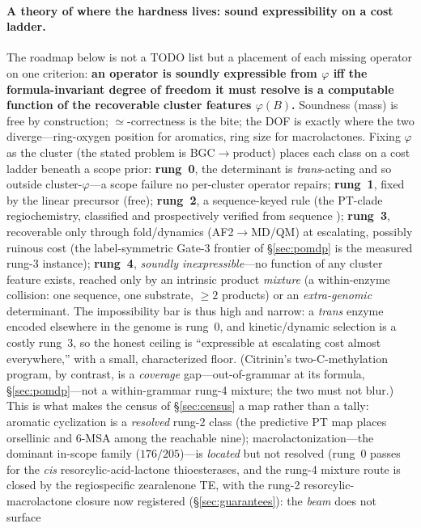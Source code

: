 \documentclass[11pt]{article}
\theoremstyle{definition}
\begin{document}
\paragraph{A theory of where the hardness lives: sound expressibility on a cost ladder.} The roadmap
below is not a TODO list but a placement of each missing operator on one criterion: \textbf{an operator
is soundly expressible from $\varphi$ iff the formula-invariant degree of freedom it must resolve is a
computable function of the recoverable cluster features $\varphi(B)$.} Soundness (mass) is free by
construction; $\simeq$-correctness is the bite; the DOF is exactly where the two diverge---ring-oxygen
position for aromatics, ring size for macrolactones. Fixing $\varphi$ as the cluster (the stated problem
is BGC$\to$product) places each class on a cost ladder beneath a scope prior: \textbf{rung~0}, the
determinant is \emph{trans}-acting and so outside cluster-$\varphi$---a scope failure no per-cluster
operator repairs; \textbf{rung~1}, fixed by the linear precursor (free); \textbf{rung~2}, a sequence-keyed
rule (the PT-clade regiochemistry, classified and prospectively verified from sequence
\citep{ptregio}); \textbf{rung~3}, recoverable only through fold/dynamics (AF2$\to$MD/QM) at escalating,
possibly ruinous cost (the label-symmetric Gate-3 frontier of \S\ref{sec:pomdp} is the measured rung-3
instance); \textbf{rung~4}, \emph{soundly inexpressible}---no function of any cluster feature
exists, reached only by an intrinsic product \emph{mixture} (a within-enzyme collision: one sequence, one
substrate, $\ge2$ products) or an \emph{extra-genomic} determinant. The impossibility bar is thus high
and narrow: a \emph{trans} enzyme encoded elsewhere in the genome is rung~0, and kinetic/dynamic selection
is a costly rung~3, so the honest ceiling is ``expressible at escalating cost almost everywhere,'' with a
small, characterized floor. (Citrinin's two-C-methylation program, by contrast, is a \emph{coverage}
gap---out-of-grammar at its formula, \S\ref{sec:pomdp}---not a within-grammar rung-4 mixture; the two
must not blur.) This is what makes the census of \S\ref{sec:census} a map rather than a tally:
aromatic cyclization is a \emph{resolved} rung-2 class (the predictive PT map places orsellinic and 6-MSA
among the reachable nine); macrolactonization---the dominant in-scope family ($176/205$)---is
\emph{located} but not resolved (rung~0 passes for the \emph{cis} resorcylic-acid-lactone thioesterases,
and the rung-4 mixture route is closed by the regiospecific zearalenone TE, with the rung-2
resorcylic-macrolactone closure now registered (\S\ref{sec:guarantees}): the \emph{beam} does not surface
\end{document}
